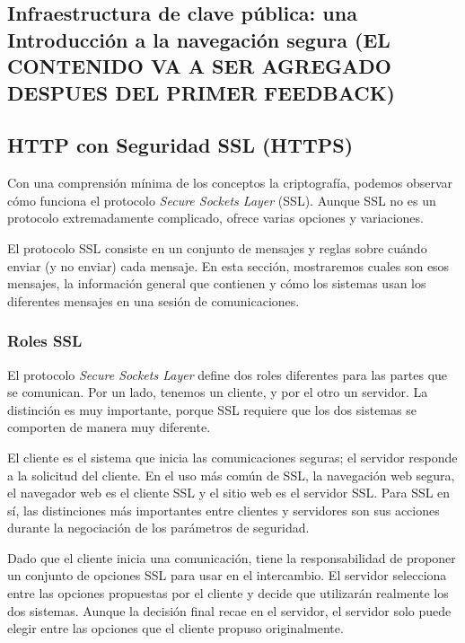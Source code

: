 \subsection{Infraestructura de clave pública: una Introducción a la navegación segura (EL CONTENIDO 
VA A SER AGREGADO DESPUES DEL PRIMER FEEDBACK) }   

%

\subsection{HTTP con Seguridad SSL (HTTPS)} 

Con una comprensión mínima de los conceptos la criptografía, podemos 
observar cómo funciona el protocolo \emph{Secure Sockets Layer} (SSL). Aunque
 SSL no es un protocolo extremadamente complicado, ofrece varias 
 opciones y variaciones.

El protocolo SSL consiste en un conjunto de mensajes y reglas sobre
 cuándo enviar (y no enviar) cada mensaje. En esta sección, mostraremos 
 cuales son esos mensajes, la información general que contienen y 
 cómo los sistemas usan los diferentes mensajes en una sesión de
  comunicaciones.


\subsubsection*{Roles SSL}
El protocolo \emph{Secure Sockets Layer} define dos roles diferentes para las
partes que se comunican. Por un lado, tenemos un cliente, y por el otro
un servidor. La distinción es muy importante, porque SSL requiere que 
los dos sistemas se comporten de manera muy diferente. 

El cliente es el sistema que inicia las comunicaciones seguras; el 
servidor responde a la solicitud del cliente. En el uso más común 
de SSL, la navegación web segura, el navegador web es el cliente SSL 
y el sitio web es el servidor SSL. Para SSL en sí, las distinciones 
más importantes entre clientes y servidores son sus acciones durante 
la negociación de los parámetros de seguridad.

Dado que el cliente inicia una comunicación, tiene la responsabilidad 
de proponer un conjunto de opciones SSL para usar en el intercambio. 
El servidor selecciona entre las opciones propuestas por el cliente 
y decide que utilizarán realmente los dos sistemas. Aunque la decisión 
final recae en el servidor, el servidor solo puede elegir entre las 
opciones que el cliente propuso originalmente.


